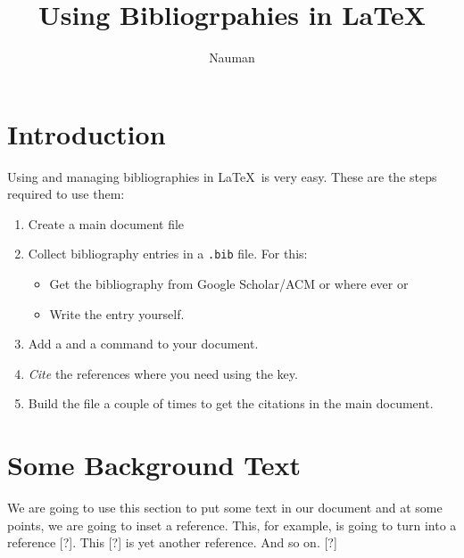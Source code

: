 \documentclass{article}
\begin{document}
\title{Using Bibliogrpahies in \LaTeX}
\author{Nauman}
\maketitle


\section{Introduction} 
Using and managing bibliographies in \LaTeX\ is very easy. These are the steps required to use them: 

\begin{enumerate}
	\item Create a main document file 
	\item Collect bibliography entries in a \verb|.bib| file. For this: 
	   \begin{itemize}
	     \item Get the bibliography from Google Scholar/ACM or where ever or 
	     \item Write the entry yourself. 
     \end{itemize}
	\item Add a \verb|| and a \verb|| command to your document. 
	\item \emph{Cite} the references where you need using the key. 
	\item Build the file a couple of times to get the citations in the main document. 
\end{enumerate}

\section{Some Background Text}
We are going to use this section to put some text in our document and at some points, we are going to inset a reference. This, for example, is going to turn into a reference [?]. This [?] is yet another reference. And so on. [?]




\end{document}
